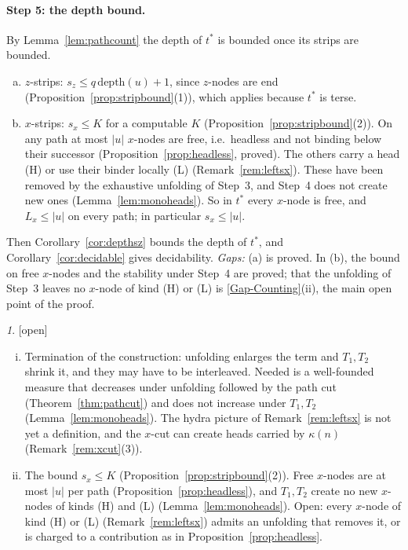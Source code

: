 \documentclass[11pt]{article}
\newcommand{\depth}{\mathrm{depth}}
\newcommand{\Open}{\textsf{\color{red!60!black}[open]}}
\theoremstyle{plain}
\theoremstyle{definition}
\theoremstyle{remark}
\newtheorem*{gapenv}{\gapname}
\newcommand{\gapname}{Gap}
\newcommand{\GapCounting}{\hyperref[gap:count]{[Gap-Counting]}}
\begin{document}
\paragraph{Step 5: the depth bound.}
By Lemma~\ref{lem:pathcount} the depth of $t^*$ is bounded once its
strips are bounded.
\begin{enumerate}[(a)]
\item $z$-strips: $s_z\le q\,\depth(u)+1$, since $z$-nodes are end
  (Proposition~\ref{prop:stripbound}(1)), which applies because $t^*$
  is terse.
\item $x$-strips: $s_x\le K$ for a computable $K$
  (Proposition~\ref{prop:stripbound}(2)).  On any path at most $|u|$
  $x$-nodes are free, i.e.\ headless and not binding below their
  successor (Proposition~\ref{prop:headless}, proved).  The others carry
  a head (H) or use their binder locally (L)
  (Remark~\ref{rem:leftsx}).  These have been removed by the
  exhaustive unfolding of Step~3, and Step~4 does not create new ones
  (Lemma~\ref{lem:monoheads}).  So in $t^*$ every $x$-node is free,
  and $L_x\le|u|$ on every path; in particular $s_x\le|u|$.
\end{enumerate}
Then Corollary~\ref{cor:depthsz} bounds the depth of $t^*$, and
Corollary~\ref{cor:decidable} gives decidability.
\emph{Gaps:} (a) is proved.  In (b), the bound on free $x$-nodes and
the stability under Step~4 are proved; that the unfolding of Step~3
leaves no $x$-node of kind (H) or (L) is \GapCounting{}(ii), the main
open point of the proof.

\renewcommand{\gapname}{[Gap-Counting]}
\begin{gapenv}\label{gap:count}
\Open{}
\begin{enumerate}[(i)]
\item Termination of the construction: unfolding enlarges the term and
  $T_1,T_2$ shrink it, and they may have to be interleaved.  Needed is a
  well-founded measure that decreases under unfolding followed by the
  path cut (Theorem~\ref{thm:pathcut}) and does not increase under
  $T_1,T_2$ (Lemma~\ref{lem:monoheads}).  The hydra picture of
  Remark~\ref{rem:leftsx} is not yet a definition, and the $x$-cut can
  create heads carried by $\kappa(n)$ (Remark~\ref{rem:xcut}(3)).
\item The bound $s_x\le K$ (Proposition~\ref{prop:stripbound}(2)).
  Free $x$-nodes are at most $|u|$ per path
  (Proposition~\ref{prop:headless}), and $T_1,T_2$ create no new
  $x$-nodes of kinds (H) and (L) (Lemma~\ref{lem:monoheads}).  Open:
  every $x$-node of kind (H) or (L) (Remark~\ref{rem:leftsx}) admits an
  unfolding that removes it, or is charged to a contribution as in
  Proposition~\ref{prop:headless}.
\end{enumerate}
\end{gapenv}
\end{document}
